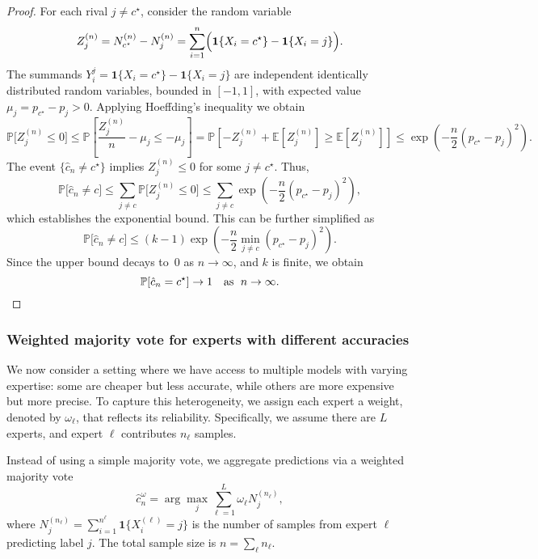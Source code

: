 \begin{proof}
For each rival $j\neq c^\star$, consider the random variable
\begin{equation}\label{eq:random_variable_sum_auxiliary}
    Z_j^{(n)} = N_{c^\star}^{(n)} -  N_j^{(n)}= \sum_{i=1}^n\Bigl(\mathbf 1\{X_i=c^\star\}-\mathbf 1\{X_i=j\}\Bigr).
\end{equation}
The summands $Y_i^j = \mathbf 1\{X_i=c^\star\}-\mathbf 1\{X_i=j\}$ are independent identically distributed random variables, bounded in $[-1,1]$, with expected value $\mu_j = p_{c^\star}-p_j>0$.
Applying Hoeffding's inequality we obtain
\small
    $$
    \mathbb{P}\bigl[Z_j^{(n)} \leq 0\bigr] \leq \mathbb{P}\left[\frac{Z_j^{(n)}}{n}- \mu_j\leq -\mu_j\right] = \mathbb{P}\left[-Z_j^{(n)}+ \mathbb{E}[Z_j^{(n)}]\geq \mathbb{E}[Z_j^{(n)}]\right] \leq \exp\left(-\frac{n}{2}(p_{c^\star}-p_j)^2\right).
    $$
\normalsize
The event $\{\hat{c}_n\neq c^\star\}$ implies $Z_j^{(n)}\le 0$ for some $j\neq c^\star$. Thus,
$$
    \mathbb{P}\bigl[\hat{c}_n\neq c\bigr]
    \le \sum_{j\neq c}\mathbb{P}\bigl[Z_j^{(n)}\le 0\bigr]
    \le \sum_{j\neq c}\exp\left(-\frac{n}{2}(p_{c^\star}-p_j)^2\right),
$$
which establishes the exponential bound. This can be further simplified as 
$$
    \mathbb{P}\bigl[\hat{c}_n\neq c\bigr]
    \le (k-1)\exp\left(-\frac{n}{2}\min_{j\neq c}(p_{c^\star}-p_j)^2\right).
$$
Since the upper bound decays to~$0$ as $n\to \infty$, and $k$ is finite, we obtain
$$
    \mathbb{P}[\hat{c}_n=c^\star]\to 1\quad \text{as\; $n\to\infty$}.
$$
\end{proof}

\subsubsection{Weighted majority vote for experts with different accuracies}\label{app:weighted_majority_vote}
We now consider a setting where we have access to multiple models with varying expertise: some are cheaper but less accurate, while others are more expensive but more precise. To capture this heterogeneity, we assign each expert a weight, denoted by $\omega_\ell$, that reflects its reliability. Specifically, we assume there are $L$ experts, and expert $\ell$ contributes $n_\ell$ samples.

Instead of using a simple majority vote, we aggregate predictions via a weighted majority vote
$$
\hat{c}_n^\omega = \arg\max_j \sum_{\ell =1}^L \omega_\ell { N_j^{(n_\ell)}},
$$
where $N_j^{(n_\ell)}= \sum_{i=1}^{n^\ell} \mathbf 1\!\bigl\{X^{(\ell)}_i=j\bigr\}$ is the number of samples from expert $\ell$ predicting label $j$. The total sample size is $n=\sum_\ell n_\ell$.

